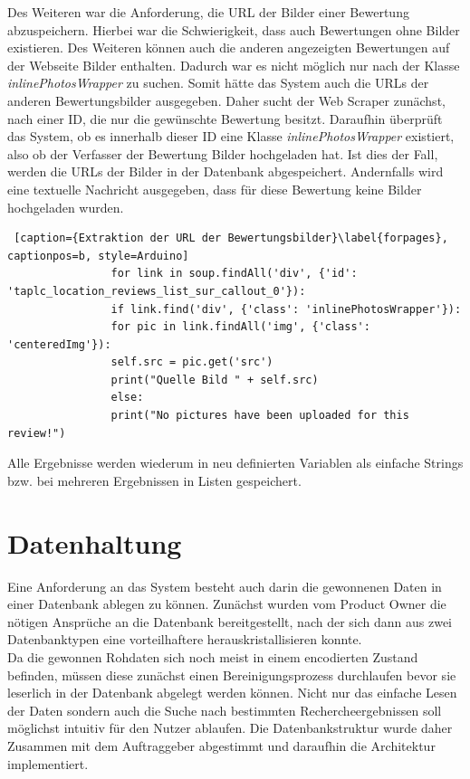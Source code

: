 \documentclass[a4paper,oneside,12pt]{report}
\begin{document}
				
				Des Weiteren war die Anforderung, die URL der Bilder einer Bewertung abzuspeichern. Hierbei war die Schwierigkeit, dass auch Bewertungen ohne Bilder existieren. Des Weiteren können auch die anderen angezeigten Bewertungen auf der Webseite Bilder enthalten. Dadurch war es nicht möglich nur nach der Klasse \textit{inlinePhotosWrapper} zu suchen. Somit hätte das System auch die URLs der anderen Bewertungsbilder ausgegeben.  
				Daher sucht der Web Scraper zunächst, nach einer ID, die nur die gewünschte Bewertung besitzt. Daraufhin überprüft das System, ob es innerhalb dieser ID eine Klasse \textit{inlinePhotosWrapper} existiert, also ob der Verfasser der Bewertung Bilder hochgeladen hat. Ist dies der Fall, werden die URLs der Bilder in der Datenbank abgespeichert. Andernfalls wird eine textuelle Nachricht ausgegeben, dass für diese Bewertung keine Bilder hochgeladen wurden.
				\\
				\begin{lstlisting} [caption={Extraktion der URL der Bewertungsbilder}\label{forpages}, captionpos=b, style=Arduino]
				for link in soup.findAll('div', {'id': 'taplc_location_reviews_list_sur_callout_0'}):
				if link.find('div', {'class': 'inlinePhotosWrapper'}):
				for pic in link.findAll('img', {'class': 'centeredImg'}):
				self.src = pic.get('src')
				print("Quelle Bild " + self.src)
				else:
				print("No pictures have been uploaded for this review!")
				\end{lstlisting}
				
				Alle Ergebnisse werden wiederum in neu definierten Variablen als einfache Strings bzw. bei mehreren Ergebnissen in Listen gespeichert. 
			
		\section{Datenhaltung}
			Eine Anforderung an das System besteht auch darin die gewonnenen Daten in einer Datenbank ablegen zu können. Zunächst wurden vom Product Owner die nötigen Ansprüche an die Datenbank bereitgestellt, nach der sich dann aus zwei Datenbanktypen eine vorteilhaftere herauskristallisieren konnte. 
			\\
			Da die gewonnen Rohdaten sich noch meist in einem encodierten Zustand befinden, müssen diese zunächst einen Bereinigungsprozess durchlaufen bevor sie leserlich in der Datenbank abgelegt werden können. Nicht nur das einfache Lesen der Daten sondern auch die Suche nach bestimmten Rechercheergebnissen soll möglichst intuitiv für den Nutzer ablaufen. Die Datenbankstruktur wurde daher Zusammen mit dem Auftraggeber abgestimmt und daraufhin die Architektur implementiert.
		
\end{document}

